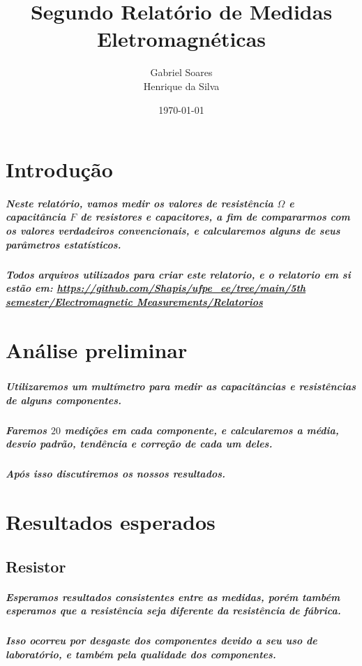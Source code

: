 \documentclass[12pt,twoside, a4paper, twocolumn]{article}
\title{Segundo Relatório de Medidas Eletromagnéticas}
\author{Gabriel Soares \\ Henrique da Silva}
\date{\today}
\begin{document}
\maketitle
{}
\newpage
\tableofcontents
\newpage



\section{Introdução}


\subparagraph*{Neste relatório, vamos medir os valores de resistência $\varOmega$ e capacitância $F$ de resistores e capacitores, a fim de compararmos com os valores verdadeiros convencionais, e calcularemos alguns de seus parâmetros estatísticos.}

\subparagraph*{Todos arquivos utilizados para criar este relatorio, e o relatorio em si estão em:  \url{https://github.com/Shapis/ufpe_ee/tree/main/5th semester/Electromagnetic Measurements/Relatorios}}




\section{Análise preliminar}
\subparagraph*{}


\subparagraph*{Utilizaremos um multímetro para medir as capacitâncias e resistências de alguns componentes.}

\subparagraph*{Faremos $20$ medições em cada componente, e calcularemos a média, desvio padrão, tendência e correção de cada um deles.}

\subparagraph*{Após isso discutiremos os nossos resultados.}

\section{Resultados esperados}

\subsection{Resistor}

\subparagraph*{Esperamos resultados consistentes entre as medidas, porém também esperamos que a resistência seja diferente da resistência de fábrica.}

\subparagraph*{Isso ocorreu por desgaste dos componentes devido a seu uso de laboratório, e também pela qualidade dos componentes.}
\end{document}
